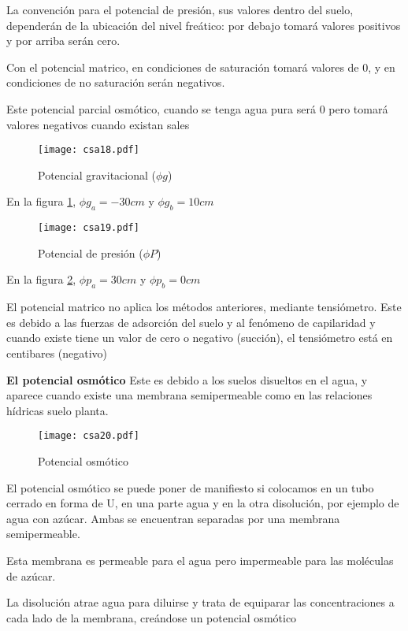 La convención para el potencial de presión, sus valores dentro del suelo, dependerán de la ubicación del nivel freático: por debajo tomará valores positivos y por arriba serán cero.

Con el potencial matrico, en condiciones de saturación tomará valores de 0, y en condiciones de no saturación serán negativos.

Este potencial parcial osmótico, cuando se tenga agua pura será 0 pero tomará valores negativos cuando existan sales

\begin{figure}[h!]
    \centering
      \texttt{[image: csa18.pdf]}
      \caption{Potencial gravitacional ($\phi g$)}
      \label{csa18}
    \end{figure}
    En la figura \ref{csa18}, $\phi g_{a}=-30cm$ y $\phi g_{b}=10cm$
    \begin{figure}[h!]
    \centering
      \texttt{[image: csa19.pdf]}
      \caption{Potencial de presión ($\phi P$)}
      \label{csa19}
    \end{figure}
    En la figura \ref{csa19}, $\phi p_a=30cm$ y $\phi p_b=0cm$
    
    El potencial matrico no aplica los métodos anteriores, mediante tensiómetro. Este es debido a las fuerzas de adsorción del suelo y al fenómeno de capilaridad y cuando existe tiene un valor de cero o negativo (succión), el tensiómetro está en centibares (negativo)
    
    \textbf{El potencial osmótico}
    Este es debido a los suelos disueltos en el agua, y aparece cuando existe una membrana semipermeable como en las relaciones hídricas suelo planta.
    \begin{figure}[h!]
    \centering
      \texttt{[image: csa20.pdf]}
      \caption{Potencial osmótico}
      \label{csa20}
    \end{figure}
    El potencial osmótico se puede poner de manifiesto si colocamos en un tubo cerrado en forma de U, en una parte agua y en la otra disolución, por ejemplo de agua con azúcar. Ambas se encuentran separadas por una membrana semipermeable.
    
    Esta membrana es permeable para el agua pero impermeable para las moléculas de azúcar.
    
    La disolución atrae agua para diluirse y trata de equiparar las concentraciones a cada lado de la membrana, creándose un potencial osmótico
    
